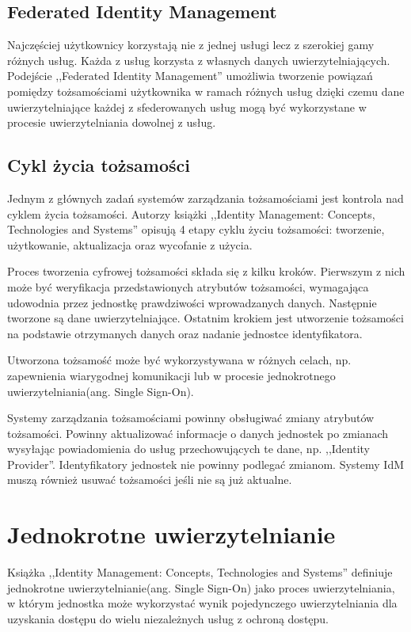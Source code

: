 	\subsection{Federated Identity Management}

		Najczęściej użytkownicy korzystają nie z jednej usługi lecz z szerokiej gamy różnych usług. Każda z usług korzysta z własnych danych uwierzytelniających. Podejście ,,Federated Identity Management'' umożliwia tworzenie powiązań pomiędzy tożsamościami użytkownika w ramach różnych usług dzięki czemu dane uwierzytelniające każdej z sfederowanych usług mogą być wykorzystane w procesie uwierzytelniania dowolnej z usług.

	\subsection{Cykl życia tożsamości}

		Jednym z głównych zadań systemów zarządzania tożsamościami jest kontrola nad cyklem życia tożsamości. Autorzy książki ,,Identity Management: Concepts, Technologies and Systems'' opisują 4 etapy cyklu życiu tożsamości: tworzenie, użytkowanie, aktualizacja oraz wycofanie z użycia\cite{Bertino11}.

		Proces tworzenia cyfrowej tożsamości składa się z kilku kroków. Pierwszym z nich może być weryfikacja przedstawionych atrybutów tożsamości, wymagająca udowodnia przez jednostkę prawdziwości wprowadzanych danych. Następnie tworzone są dane uwierzytelniające. Ostatnim krokiem jest utworzenie tożsamości na podstawie otrzymanych danych oraz nadanie jednostce identyfikatora.

		Utworzona tożsamość może być wykorzystywana w różnych celach, np. zapewnienia wiarygodnej komunikacji lub w procesie jednokrotnego uwierzytelniania(ang. Single Sign-On).

		Systemy zarządzania tożsamościami powinny obsługiwać zmiany atrybutów tożsamości. Powinny aktualizować informacje o danych jednostek po zmianach wysyłając powiadomienia do usług przechowujących te dane, np. ,,Identity Provider''. Identyfikatory jednostek nie powinny podlegać zmianom. Systemy IdM muszą również usuwać tożsamości jeśli nie są już aktualne.

\section{Jednokrotne uwierzytelnianie}

	Książka ,,Identity Management: Concepts, Technologies and Systems'' definiuje jednokrotne uwierzytelnianie(ang. Single Sign-On) jako proces uwierzytelniania, w którym jednostka może wykorzystać wynik pojedynczego uwierzytelniania dla uzyskania dostępu do wielu niezależnych usług z ochroną dostępu\cite{Bertino11}. 

